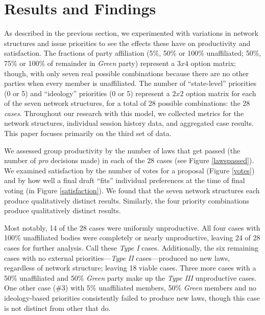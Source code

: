 \documentclass[pdftex,12pt]{llncs}
\begin{document}
\section{Results and Findings}
%
As described in the previous section, we experimented with variations in network structures and issue priorities to see the effects these have on productivity and satisfaction.
The fractions of party affiliation (5\%, 50\% or 100\% unaffiliated; 50\%, 75\% or 100\% of remainder in \textit{Green} party) represent a $3 x 4$ option matrix; though, with only seven real possible combinations because there are no other parties when every member is unaffiliated. 
The number of ``state-level'' priorities (0 or 5) and ``ideology'' priorities (0 or 5) represent a $2 x 2$ option matrix for each of the seven network structures, for a total of 28 possible combinations: the 28 \textit{cases}.
Throughout our research with this model, we collected metrics for the network structures, individual session history data, and aggregated case results.
This paper focuses primarily on the third set of data. 

We assessed group productivity by the number of laws that get passed (the number of \textit{pro} decisions made) in each of the 28 cases (see Figure \ref{lawspassed}). 
We examined satisfaction by the number of votes for a proposal (Figure \ref{votes}) and by how well a final draft ``fits'' individual preferences at the time of final voting (in Figure \ref{satisfaction}). 
We found that the seven network structures each produce qualitatively distinct results.
Similarly, the four priority combinations produce qualitatively distinct results. 

Most notably, 14 of the 28 cases were uniformly unproductive.
All four cases with 100\% unaffiliated bodies were completely or nearly unproductive, leaving 24 of 28 cases for further analysis.
Call these \textit{Type I} cases.
Additionally, the six remaining cases with no external priorities---\textit{Type II} cases---produced no new laws, regardless of network structure; leaving 18 viable cases.
Three more cases with a 50\% unaffiliated and 50\% \textit{Green} party make up the \textit{Type III} unproductive cases.
One other case (\#3) with 5\% unaffiliated members, 50\% \textit{Green} members and no ideology-based priorities consistently failed to produce new laws, though this case is not distinct from other that do. 
\end{document}
